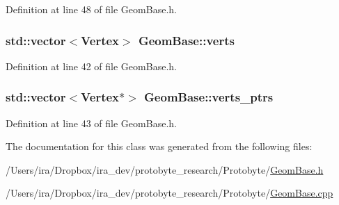 Definition at line 48 of file Geom\-Base.\-h.

\hypertarget{class_geom_base_ad9a00c1c60c9283b3a5995e8cfc6afb5}{
\subsubsection[{verts}]{\setlength{\rightskip}{0pt plus 5cm}std\-::vector$<${\bf Vertex}$>$ Geom\-Base\-::verts\hspace{0.3cm}{\ttfamily [protected]}}}\label{class_geom_base_ad9a00c1c60c9283b3a5995e8cfc6afb5}


Definition at line 42 of file Geom\-Base.\-h.

\hypertarget{class_geom_base_a345dad26b0f2e40b097546774baed95d}{
\subsubsection[{verts\-\_\-ptrs}]{\setlength{\rightskip}{0pt plus 5cm}std\-::vector$<${\bf Vertex}$\ast$$>$ Geom\-Base\-::verts\-\_\-ptrs\hspace{0.3cm}{\ttfamily [protected]}}}\label{class_geom_base_a345dad26b0f2e40b097546774baed95d}


Definition at line 43 of file Geom\-Base.\-h.



The documentation for this class was generated from the following files\-:\begin{DoxyCompactItemize}
\item 
/\-Users/ira/\-Dropbox/ira\-\_\-dev/protobyte\-\_\-research/\-Protobyte/\hyperlink{_geom_base_8h}{Geom\-Base.\-h}\item 
/\-Users/ira/\-Dropbox/ira\-\_\-dev/protobyte\-\_\-research/\-Protobyte/\hyperlink{_geom_base_8cpp}{Geom\-Base.\-cpp}\end{DoxyCompactItemize}
